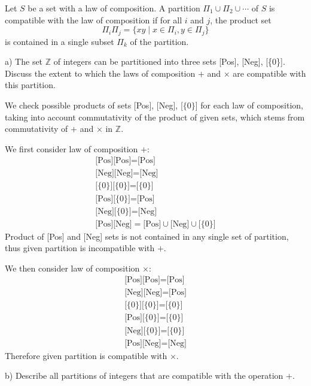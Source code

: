 \documentclass{article}
\theoremstyle{definition}
\newcommand{\Z}{\mathbb{Z}}
\begin{document}
\begin{tcolorbox}
Let $S$ be a set with a law of composition. A partition $\Pi_1 \cup \Pi_2 \cup \cdots$ of $S$ is compatible with the law of composition if for all $i$ and $j$, the product set
\[ \Pi_i \Pi_j = \{ xy \mid x \in \Pi_i, y \in \Pi_j \} \]
is contained in a single subset $\Pi_k$ of the partition.

a) The set $\Z$ of integers can be partitioned into three sets [Pos], [Neg], [\{0\}].
Discuss the extent to which the laws of composition $+$ and $\times$ are compatible with this partition.

\end{tcolorbox}

We check possible products of sets [Pos], [Neg], [$\{0\}$] for each law of composition, taking into account commutativity of the product of given sets, which stems from commutativity of $+$ and $\times$ in $\Z$.

We first consider law of composition $+$:
\begin{gather*}
    \text{[Pos]}\text{[Pos]} = \text{[Pos]} \\
    \text{[Neg]}\text{[Neg]} = \text{[Neg]} \\
    \text{[\{0\}]}\text{[\{0\}]} = \text{[\{0\}]} \\
    \text{[Pos]}\text{[\{0\}]} = \text{[Pos]} \\
    \text{[Neg]}\text{[\{0\}]} = \text{[Neg]} \\
    \text{[Pos]}\text{[Neg]} = \text{[Pos]} \cup \text{[Neg]} \cup \text{[\{0\}]}
\end{gather*}
Product of [Pos] and [Neg] sets is not contained in any single set of partition, thus given partition is incompatible with $+$.

We then consider law of composition $\times$:
\begin{gather*}
    \text{[Pos]}\text{[Pos]} = \text{[Pos]} \\
    \text{[Neg]}\text{[Neg]} = \text{[Pos]} \\
    \text{[\{0\}]}\text{[\{0\}]} = \text{[\{0\}]} \\
    \text{[Pos]}\text{[\{0\}]} = \text{[\{0\}]} \\
    \text{[Neg]}\text{[\{0\}]} = \text{[\{0\}]} \\
    \text{[Pos]}\text{[Neg]} = \text{[Neg]}
\end{gather*}
Therefore given partition is compatible with $\times$.


\begin{tcolorbox}
b) Describe all partitions of integers that are compatible with the operation $+$.
\end{tcolorbox}
\end{document}
